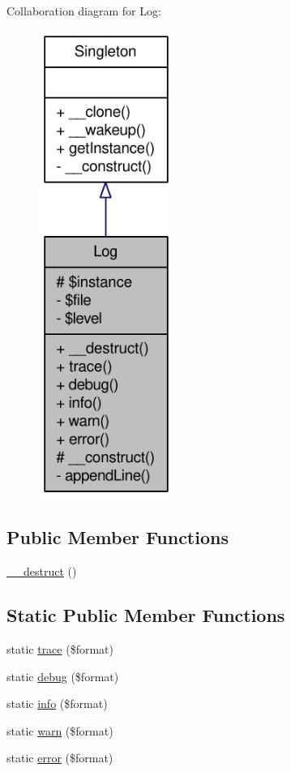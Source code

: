 Collaboration diagram for Log:\nopagebreak
\begin{figure}[H]
\begin{center}
\leavevmode
\includegraphics[width=124pt]{classLog__coll__graph}
\end{center}
\end{figure}
\subsection*{Public Member Functions}
\begin{DoxyCompactItemize}
\item 
\hyperlink{classLog_a8a98440f17cf6a9ce14597897e845abf}{\_\-\_\-destruct} ()
\end{DoxyCompactItemize}
\subsection*{Static Public Member Functions}
\begin{DoxyCompactItemize}
\item 
static \hyperlink{classLog_acc7be3022ea0ea09cc35eca4fd05ebb6}{trace} (\$format)
\item 
static \hyperlink{classLog_a9cbcd40831b44a7fc43494d32544ca45}{debug} (\$format)
\item 
static \hyperlink{classLog_aad760acd04b0f64236f8d90519a3bef8}{info} (\$format)
\item 
static \hyperlink{classLog_a3dae74a7d221b316861c88726d07c65a}{warn} (\$format)
\item 
static \hyperlink{classLog_ae64520f1abc38b59df669bd62174317e}{error} (\$format)
\end{DoxyCompactItemize}
